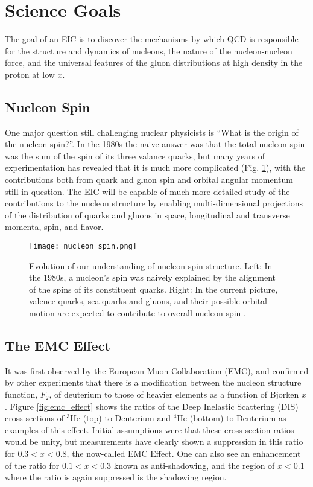 \section{Science Goals}
The goal of an EIC is to discover the mechanisms by which QCD is responsible for the structure and dynamics of nucleons, the nature of the nucleon-nucleon force, and the universal features of the gluon distributions at high density in the proton at low $x$.

\subsection{Nucleon Spin}
One major question still challenging nuclear physicists is ``What is the origin of the nucleon spin?''. In the 1980s the naive answer was that the total nucleon spin was the sum of the spin of its three valance quarks, but many years of experimentation has revealed that it is much more complicated (Fig. \ref{fig:nucleon_spin}), with the contributions both from quark and gluon spin and orbital angular momentum still in question. The EIC will be capable of much more detailed study of the contributions to the nucleon structure by enabling multi-dimensional projections of the distribution of quarks and gluons in space, longitudinal and transverse momenta, spin, and flavor.

\begin{figure}[!htb]
	\centering
	\texttt{[image: nucleon\_spin.png]}
	\caption[Evolution of our understanding of nucleon spin structure.]{Evolution of our understanding of nucleon spin structure. Left: In the 1980s, a nucleon’s spin was naively explained by the alignment of the spins of its constituent quarks. Right: In the current picture, valence quarks, sea quarks and gluons, and their possible orbital motion are expected to contribute to overall nucleon spin \cite{EICWhitePaper}.}
	\label{fig:nucleon_spin}
\end{figure}

\subsection{The EMC Effect}
It was first observed by the European Muon Collaboration (EMC), and confirmed by other experiments that there is a modification between the nucleon structure function, $F_2$, of deuterium to those of heavier elements as a function of Bjorken $x$ \cite{SRC_EMC_effect}. Figure \ref{fig:emc_effect} shows the ratios of the Deep Inelastic Scattering (DIS) cross sections of ${}^3$He (top) to Deuterium and ${}^4$He (bottom) to Deuterium as examples of this effect. Initial assumptions were that these cross section ratios would be unity, but measurements have clearly shown a suppression in this ratio for $0.3 < x < 0.8$, the now-called EMC Effect. One can also see an enhancement of the ratio for $0.1 < x < 0.3$ known as anti-shadowing, and the region of $x < 0.1$ where the ratio is again suppressed is the shadowing region.

